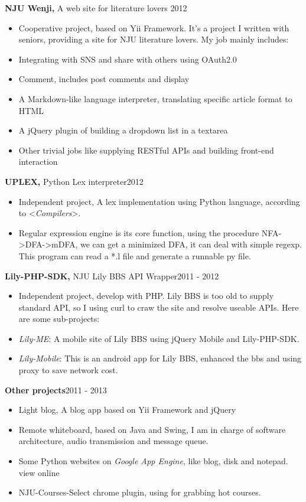 \documentclass[margin]{res}
\begin{document}
\begin{resume}
{\bf NJU Wenji,} A web site for literature lovers \hfill 2012
\begin{itemize} \itemsep -2pt
  \item Cooperative project, based on Yii Framework. It's a project I written with seniors, providing a site for NJU literature lovers. My job mainly includes:
  \item Integrating with SNS and share with others using OAuth2.0
  \item Comment, includes post comments and display
  \item A Markdown-like language interpreter, translating specific article format to HTML
  \item A jQuery plugin of building a dropdown list in a textarea
  \item Other trivial jobs like supplying RESTful APIs and building front-end interaction
\end{itemize}

{\bf UPLEX,} Python Lex interpreter\hfill 2012
\begin{itemize} \itemsep -2pt
  \item Independent project, A lex implementation using Python language, according to <{\it Compilers}>.
  \item Regular expression engine is its core function, using the procedure NFA->DFA->mDFA, we can get a minimized DFA, it can deal with simple regexp. This program can read a *.l file and generate a runnable py file.
\end{itemize}

{\bf Lily-PHP-SDK,} NJU Lily BBS API Wrapper\hfill 2011 - 2012
\begin{itemize} \itemsep -2pt
  \item Independent project, develop with PHP. Lily BBS is too old to supply standard API, so I using curl to craw the site and resolve useable APIs. Here are some sub-projects:
  \item {\it Lily-ME}: A mobile site of Lily BBS using jQuery Mobile and Lily-PHP-SDK.
  \item {\it Lily-Mobile}: This is an android app for Lily BBS, enhanced the bbs and using proxy to save network cost.
\end{itemize}

{\bf Other projects}\hfill 2011 - 2013
\begin{itemize} \itemsep -2pt
  \item Light blog, A blog app based on Yii Framework and jQuery
  \item Remote whiteboard, based on Java and Swing, I am in charge of software architecture, audio transmission and message queue.
  \item Some Python websites on {\it Google App Engine}, like blog, disk and notepad. view online
  \item NJU-Courses-Select chrome plugin, using for grabbing hot courses.
\end{itemize}


\end{resume}
\end{document}
